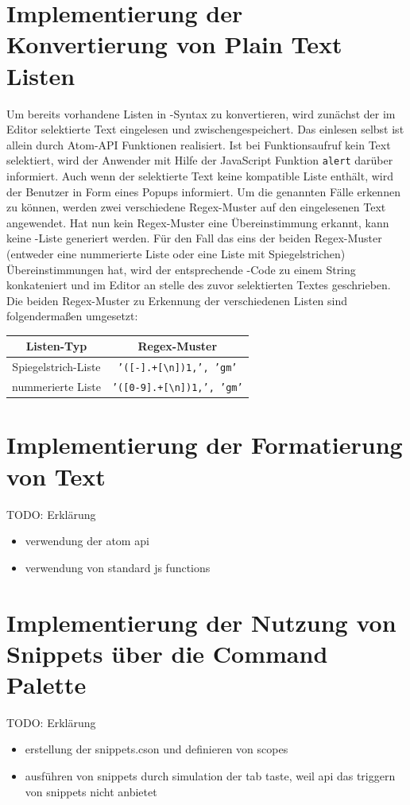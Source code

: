     \section{Implementierung der Konvertierung von Plain Text Listen}
        Um bereits vorhandene Listen in \latex-Syntax zu konvertieren, wird zunächst der im Editor selektierte Text eingelesen und zwischengespeichert. Das einlesen selbst ist allein durch Atom-API Funktionen realisiert. Ist bei Funktionsaufruf kein Text selektiert, wird der Anwender mit Hilfe der JavaScript Funktion \texttt{alert} darüber informiert. Auch wenn der selektierte Text keine kompatible Liste enthält, wird der Benutzer in Form eines Popups informiert. Um die genannten Fälle erkennen zu können, werden zwei verschiedene Regex-Muster auf den eingelesenen Text angewendet. Hat nun kein Regex-Muster eine Übereinstimmung erkannt, kann keine \latex-Liste generiert werden. Für den Fall das eins der beiden Regex-Muster (entweder eine nummerierte Liste oder eine Liste mit Spiegelstrichen) Übereinstimmungen hat, wird der entsprechende \latex-Code zu einem String konkateniert und im Editor an stelle des zuvor selektierten Textes geschrieben.
        \\
        Die beiden Regex-Muster zu Erkennung der verschiedenen Listen sind folgendermaßen umgesetzt:
        \\[5mm]
        \begin{minipage}{\textwidth}
            \centering
            \begin{tabular}{ | c | c | }
              \hline
              \textbf{Listen-Typ} & \textbf{Regex-Muster} \\
              \hline
              Spiegelstrich-Liste & \texttt{'([-].+[\textbackslash n]){1,}', 'gm'} \\
              nummerierte Liste & \texttt{'([0-9].+[\textbackslash n]){1,}', 'gm'} \\
              \hline
            \end{tabular}
        \end{minipage}
    \section{Implementierung der Formatierung von Text}
        TODO: Erklärung
        \begin{itemize}
          \item verwendung der atom api
          \item verwendung von standard js functions
        \end{itemize}
    \section{Implementierung der Nutzung von Snippets über die Command Palette}
        TODO: Erklärung
        \begin{itemize}
          \item erstellung der snippets.cson und definieren von scopes
          \item ausführen von snippets durch simulation der tab taste, weil api das triggern von snippets nicht anbietet
        \end{itemize}
